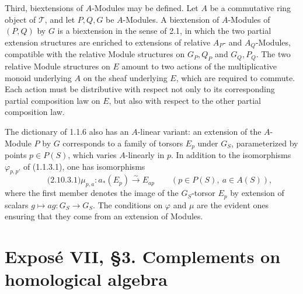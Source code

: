 \documentclass[11pt]{article}
\providecommand{\Ker}{\operatorname{Ker}}
\providecommand{\id}{\operatorname{id}}
\begin{document}
Third, biextensions of \(A\)-Modules may be defined.  Let \(A\) be a commutative ring object of \(\mathcal T\), and let \(P,Q,G\) be \(A\)-Modules.  A biextension of \(A\)-Modules of \((P,Q)\) by \(G\) is a biextension in the sense of 2.1, in which the two partial extension structures are enriched to extensions of relative \(A_P\)- and \(A_Q\)-Modules, compatible with the relative Module structures on \(G_P,Q_P\) and \(G_Q,P_Q\).  The two relative Module structures on \(E\) amount to two actions of the multiplicative monoid underlying \(A\) on the sheaf underlying \(E\), which are required to commute.  Each action must be distributive with respect not only to its corresponding partial composition law on \(E\), but also with respect to the other partial composition law.

The dictionary of 1.1.6 also has an \(A\)-linear variant: an extension of the \(A\)-Module \(P\) by \(G\) corresponds to a family of torsors \(E_p\) under \(G_S\), parameterized by points \(p\in P(S)\), which varies \(A\)-linearly in \(p\).  In addition to the isomorphisms \(\varphi_{p,p'}\) of (1.1.3.1), one has isomorphisms
\begin{equation}\qquad\text{(2.10.3.1)}
  \mu_{p,a}: a_*(E_p)\xrightarrow{\sim} E_{ap}
  \qquad(p\in P(S),\ a\in A(S)),
\end{equation}
where the first member denotes the image of the \(G_S\)-torsor \(E_p\) by extension of scalars \(g\mapsto ag:G_S\to G_S\).  The conditions on \(\varphi\) and \(\mu\) are the evident ones ensuring that they come from an extension of Modules.



\providecommand{\Biext}{\operatorname{Biext}}
\providecommand{\GrAb}{\operatorname{GrAb}}
\providecommand{\Coker}{\operatorname{Coker}}
\providecommand{\coker}{\operatorname{coker}}
\providecommand{\Ker}{\operatorname{Ker}}
\providecommand{\cofib}{\operatorname{cofib}}
\providecommand{\Dcat}{\mathrm D}
\providecommand{\Kcat}{\mathrm K}
\providecommand{\cPsi}{\mathcal\Psi}
\providecommand{\cY}{\mathcal Y}
\providecommand{\cC}{\mathcal C}
\providecommand{\cT}{\mathcal T}
\providecommand{\Hh}{\mathrm H}
\providecommand{\Tot}{\operatorname{Tot}}
\providecommand{\id}{\operatorname{id}}


\section*{Expos\'e VII, \S3. Complements on homological algebra}
\end{document}
